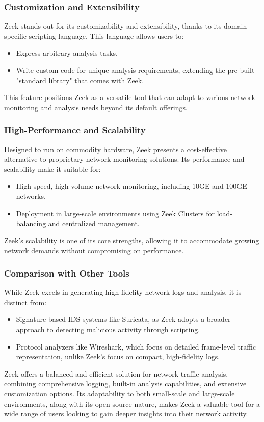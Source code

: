 \subsubsection{Customization and Extensibility}
Zeek stands out for its customizability and extensibility, thanks to its domain-specific scripting language. This language allows users to:
\begin{itemize}
    \item Express arbitrary analysis tasks.
    \item Write custom code for unique analysis requirements, extending the pre-built "standard library" that comes with Zeek.
\end{itemize}

This feature positions Zeek as a versatile tool that can adapt to various network monitoring and analysis needs beyond its default offerings.

\subsubsection{High-Performance and Scalability}
Designed to run on commodity hardware, Zeek presents a cost-effective alternative to proprietary network monitoring solutions. Its performance and scalability make it suitable for:
\begin{itemize}
    \item High-speed, high-volume network monitoring, including 10GE and 100GE networks.
    \item Deployment in large-scale environments using Zeek Clusters for load-balancing and centralized management.
\end{itemize}
 Zeek's scalability is one of its core strengths, allowing it to accommodate growing network demands without compromising on performance.
 \subsubsection{Comparison with Other Tools}
 While Zeek excels in generating high-fidelity network logs and analysis, it is distinct from:

 \begin{itemize}
     \item Signature-based IDS systems like Suricata, as Zeek adopts a broader approach to detecting malicious activity through scripting.
     \item Protocol analyzers like Wireshark, which focus on detailed frame-level traffic representation, unlike Zeek's focus on compact, high-fidelity logs.
     \newline
 \end{itemize}
Zeek offers a balanced and efficient solution for network traffic analysis, combining comprehensive logging, built-in analysis capabilities, and extensive customization options. Its adaptability to both small-scale and large-scale environments, along with its open-source nature, makes Zeek a valuable tool for a wide range of users looking to gain deeper insights into their network activity.
